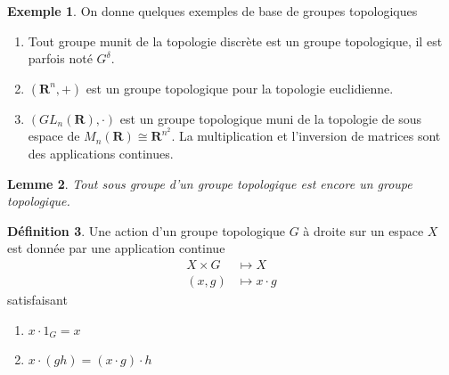 \documentclass[12pt]{book}
\newtheorem{lemma}{Lemme}[section]
\theoremstyle{definition}
\newtheorem{definition}[lemma]{Définition}
\newtheorem{example}[lemma]{Exemple}
\theoremstyle{remark}
\begin{document}
	\begin{example} On donne quelques exemples de base de groupes topologiques \\
		\begin{enumerate}
			\item Tout groupe munit de la topologie discrète est un groupe topologique, il est parfois noté $G^{\delta}$.
			\item $(\mathbf{R}^n,+)$ est un groupe topologique pour la topologie euclidienne.
			\item $(GL_n(\mathbf{R}),\cdot)$ est un groupe topologique muni de la topologie de sous espace de $M_n(\mathbf{R}) \cong \mathbf{R}^{n^2}$. La multiplication et l'inversion de matrices sont des applications continues. 
		\end{enumerate}	
	\end{example}

	\begin{lemma}
		Tout sous groupe d'un groupe topologique est encore un groupe topologique.
	\end{lemma}

	\begin{definition}
		Une action d'un groupe topologique $G$ à droite sur un espace $X$ est donnée par une application continue
		\begin{align*}
			X \times G &\longmapsto X \\
			(x,g) &\longmapsto x\cdot g
		\end{align*} satisfaisant 

		\begin{enumerate}
			\item $x \cdot 1_G = x$
			\item $x \cdot (gh) = (x \cdot g)\cdot h$
		\end{enumerate}
	\end{definition}
\end{document}
